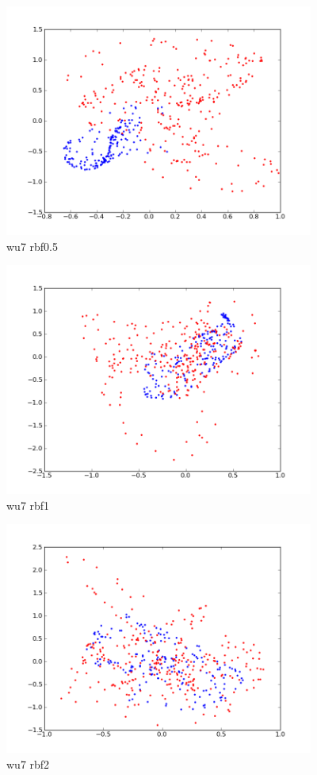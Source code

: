 \begin{figure}[here]
	\center
	\caption{wu7 rbf0.5}
	\label{fig:wu7_rbf0_5}
	\includegraphics[width=4.0in]{img/wu7_rbf0_5.png}
\end{figure}

\begin{figure}[here]
	\center
	\caption{wu7 rbf1}
	\label{fig:wu7_rbf1}
	\includegraphics[width=4.0in]{img/wu7_rbf1.png}
\end{figure}

\begin{figure}[here]
	\center
	\caption{wu7 rbf2}
	\label{fig:wu7_rbf2}
	\includegraphics[width=4.0in]{img/wu7_rbf2.png}
\end{figure}

